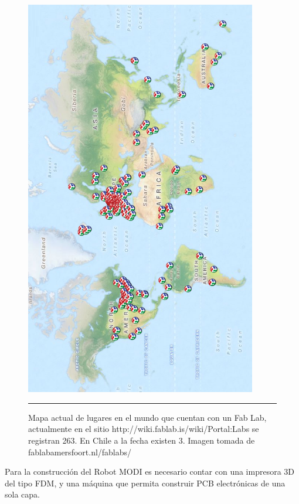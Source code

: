 \begin{figure}[htbp]
	\centering
		\includegraphics[width=0.9\textwidth]{./Figures/map.png}
		\rule{35em}{0.5pt}
	\caption[Mapa Fab Labs en el mundo.]{Mapa actual de lugares en el mundo que cuentan con un Fab Lab, actualmente en el sitio http://wiki.fablab.is/wiki/Portal:Labs se registran 263. En Chile a la fecha existen 3. Imagen tomada de fablabamersfoort.nl/fablabs/}
	\label{fig:Fablabs}
\end{figure}	

Para la construcción del Robot MODI es necesario contar con una impresora 3D del tipo FDM, y una máquina que permita construir PCB electrónicas de una sola capa.



